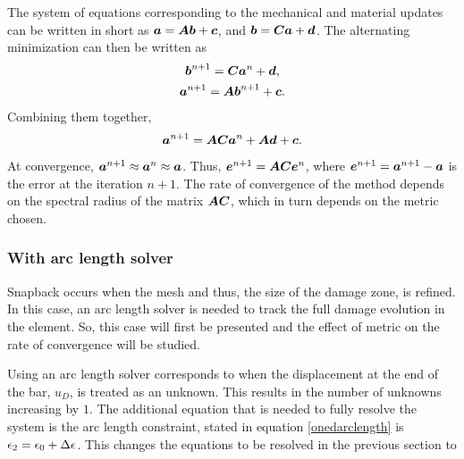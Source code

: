 \documentclass[10pt,review]{cas-sc}
\begin{document}
The system of equations corresponding to the mechanical and material updates can be written in short as $\mbox{\boldmath $a$} = \mbox{\boldmath $A$} \mbox{\boldmath $b$} + \mbox{\boldmath $c$}$, and $\mbox{\boldmath $b$} = \mbox{\boldmath $C$} \mbox{\boldmath $a$} + \mbox{\boldmath $d$}$. The alternating minimization can then be written as
\begin{gather*}
	\mbox{\boldmath $b$}^{n+1} = \mbox{\boldmath $C$} \mbox{\boldmath $a$}^{n} + \mbox{\boldmath $d$}, \\
	\mbox{\boldmath $a$}^{n+1} = \mbox{\boldmath $A$} \mbox{\boldmath $b$}^{n+1} + \mbox{\boldmath $c$}.
\end{gather*}
Combining them together, 
\begin{equation}
	\mbox{\boldmath $a$}^{n+1} = \mbox{\boldmath $A$} \mbox{\boldmath $C$}  \mbox{\boldmath $a$}^{n} +\mbox{\boldmath $A$} \mbox{\boldmath $d$} + \mbox{\boldmath $c$}. \label{combined_equn}
\end{equation}
At convergence, $\mbox{\boldmath $a$}^{n+1} \approx \mbox{\boldmath $a$}^{n} \approx \mbox{\boldmath $a$}$. Thus, $\mbox{\boldmath $e$}^{n+1} =  \mbox{\boldmath $A$} \mbox{\boldmath $C$} \mbox{\boldmath $e$}^{n}$, where $\mbox{\boldmath $e$}^{n+1} = \mbox{\boldmath $a$}^{n+1} - \mbox{\boldmath $a$}$ is the error at the iteration $n+1$. The rate of convergence of the method depends on the spectral radius of the matrix $\mbox{\boldmath $A$} \mbox{\boldmath $C$}$, which in turn depends on the metric chosen. 

\subsubsection*{With arc length solver}
Snapback occurs when the mesh and thus, the size of the damage zone, is refined. In this case, an arc length solver is needed to track the full damage evolution in the element. So, this case will first be presented and the effect of metric on the rate of convergence will be studied.

Using an arc length solver corresponds to when the displacement at the end of the bar, $u_D$, is treated as an unknown. This results in the number of unknowns increasing by $1$. The additional equation that is needed to fully resolve the system is the arc length constraint, stated in equation \ref{onedarclength} is ${\epsilon}_2 = {\epsilon}_0+ \Delta {\epsilon}$. This changes the equations to be resolved in the previous section to 
\end{document}
